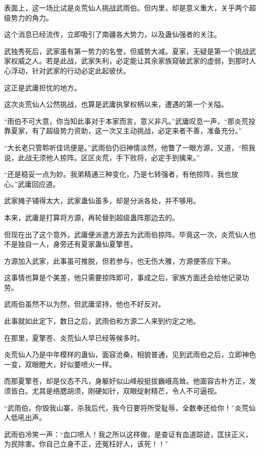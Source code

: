 \begin{this_body}
表面上，这一场比试是炎荒仙人挑战武雨伯。但内里，却是意义重大，关乎两个超级势力的角力。

这个消息已经流传，立即吸引了南疆各大势力，以及蛊仙强者的关注。

武独秀死后，武家虽有第一势力的名誉，但威势大减。夏家，无疑是第一个挑战武家权威之人。若是此战，武家失利，必定能让其余家族窥破武家的虚弱，到那时人心浮动，针对武家的行动必定此起彼伏。

这正是武庸担忧的地方。

这次炎荒仙人公然挑战，也算是武庸执掌权柄以来，遭遇的第一个关隘。

“雨伯不可大意，你当知此事对于本家而言，意义非凡。”武庸叹息一声，“那炎荒投靠夏家，有了超级势力资助，这一次又主动挑战，必定来者不善，准备充分。”

“大长老只管聆听佳讯便是。”武雨伯仍旧神情淡然，他瞥了一眼方源，又道，“照我说，此战无须他人掠阵。区区炎荒，手下败将，必定手到擒来。”

“还是稳妥一点为妙。我弟精通三种变化，乃是七转强者，有他掠阵，我也放心。”武庸回应道。

武家摊子铺得太大，武家蛊仙虽多，却是分派各处，并不够用。

本来，武庸是打算将方源，再轮替到超级蛊阵那边去的。

但现在出了这个意外，武庸便派遣方源去为武雨伯掠阵。毕竟这一次，炎荒仙人也不是独自一人，身旁还有夏家蛊仙夏擎苍。

方源加入武家，此事虽可推脱，但若参与，也无伤大雅，方源便答应下来。

这事情也算是个美差，他只需要掠阵即可，事成之后，家族方面还会给他记录功劳。

武雨伯虽然不以为然，但武庸坚持，他也不好反对。

此事就如此定下，数日之后，武雨伯和方源二人来到约定之地。

在那里，夏擎苍、炎荒仙人早已经等候多时。

炎荒仙人乃是中年模样的蛊仙，面容沧桑，相貌普通，见到武雨伯之后，立即神色一变，双眼瞪大，好似要喷火一样。

而那夏擎苍，却是仪态不凡，身躯好似山峰般挺拔巍峨高耸。他面容古朴方正，发须皆白。尤其是络腮胡须，刚硬如针，双眼绽射精芒，令人不可逼视。

“武雨伯，你毁我山寨，杀我后代，我今日要将所受耻辱，全数奉还给你！”炎荒仙人低吼出声。

武雨伯冷笑一声：“血口喷人！我之所以这样做，是查证有血道踪迹，匡扶正义，为民除害。你自己立身不正，还冤枉好人，该死！！”


\end{this_body}
